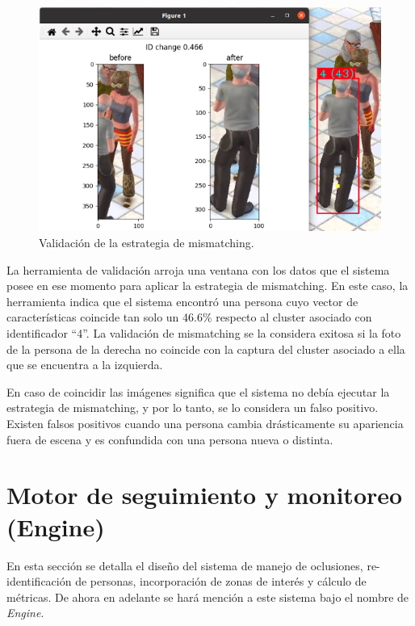 \begin{figure}[ht]
	\centering
	\includegraphics[scale=.7]{./Figures/validarMismatching.png}
	\caption{Validación de la estrategia de mismatching.}
	\label{fig:validarMismatching}
\end{figure}

La herramienta de validación arroja una ventana con los datos que el sistema posee en ese momento para aplicar la estrategia de mismatching. En este caso, la herramienta indica que el sistema encontró una persona cuyo vector de características coincide tan solo un 46.6\% respecto al cluster asociado con identificador ``4''. La validación de mismatching se la considera exitosa si la foto de la persona de la derecha no coincide con la captura del cluster asociado a ella que se encuentra a la izquierda.

En caso de coincidir las imágenes significa que el sistema no debía ejecutar la estrategia de mismatching, y por lo tanto, se lo considera un falso positivo. Existen falsos positivos cuando una persona cambia drásticamente su apariencia fuera de escena y es confundida con una persona nueva o distinta.

\newpage


\section{Motor de seguimiento y monitoreo (Engine)}
\label{sec:engine}

En esta sección se detalla el diseño del sistema de manejo de oclusiones, re-identificación de personas, incorporación de zonas de interés y cálculo de métricas. De ahora en adelante se hará mención a este sistema bajo el nombre de \textit{Engine}.

